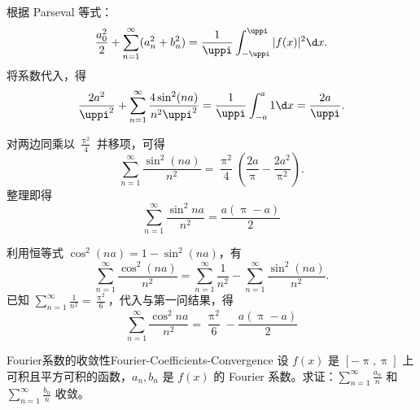 \begin{solution}
    根据 Parseval 等式：
    \begin{equation}\label{eq:parseval-4}
        \frac{a_0^2}{2} + \sum_{n=1}^{\infty} (a_n^2 + b_n^2) = \frac{1}{\uppi} \int_{-\uppi}^{\uppi} |f(x)|^2 \d x.
    \end{equation}
    将系数代入，得
    \begin{equation}\label{eq:subs-5}
        \frac{2a^2}{\uppi^2} + \sum_{n=1}^{\infty} \frac{4\sin^2(na)}{n^2\uppi^2} = \frac{1}{\uppi} \int_{-a}^{a} 1 \d x = \frac{2a}{\uppi}.
    \end{equation}


    对两边同乘以 $\frac{\uppi^2}{4}$ 并移项，可得
    \begin{equation}\label{eq:sinsum-6}
        \sum_{n=1}^{\infty} \frac{\sin^2(na)}{n^2} = \frac{\uppi^2}{4} \left( \frac{2a}{\uppi} - \frac{2a^2}{\uppi^2} \right).
    \end{equation}
    整理即得
    \begin{equation}
        \boxed{\sum_{n=1}^{\infty} \frac{\sin^2 na}{n^2} = \frac{a(\uppi - a)}{2}}
    \end{equation}


    利用恒等式 $\cos^2(na) = 1 - \sin^2(na)$，有
    \begin{equation}\label{eq:cossum-7}
        \sum_{n=1}^{\infty} \frac{\cos^2(na)}{n^2} = \sum_{n=1}^{\infty} \frac{1}{n^2} - \sum_{n=1}^{\infty} \frac{\sin^2(na)}{n^2}.
    \end{equation}
    已知 $\sum_{n=1}^{\infty} \frac{1}{n^2} = \frac{\uppi^2}{6}$，代入与第一问结果，得
    \begin{equation}
        \boxed{\sum_{n=1}^{\infty} \frac{\cos^2 na}{n^2} = \frac{\uppi^2}{6} - \frac{a(\uppi - a)}{2}}
    \end{equation}
\end{solution}

\begin{problem}{Fourier系数的收敛性}{Fourier-Coefficients-Convergence}
    设 $f(x)$ 是 $[-\uppi, \uppi]$ 上可积且平方可积的函数，$a_n, b_n$ 是 $f(x)$ 的 Fourier 系数。求证：$\sum_{n=1}^{\infty} \frac{a_n}{n}$ 和 $\sum_{n=1}^{\infty} \frac{b_n}{n}$ 收敛。
\end{problem}


